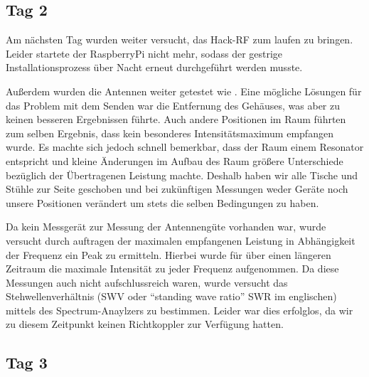 \documentclass[titlepage,11pt,a4paper,ngerman]{article}
\begin{document}
\subsection{Tag 2}

Am nächsten Tag wurden weiter versucht, das Hack-RF zum laufen zu bringen. Leider startete der RaspberryPi nicht mehr, sodass der gestrige Installationsprozess über Nacht erneut durchgeführt werden musste.\par
Außerdem wurden die Antennen weiter getestet wie . Eine mögliche Lösungen für das Problem mit dem Senden war die Entfernung des Gehäuses, was aber zu keinen besseren Ergebnissen führte. Auch andere Positionen im Raum führten zum selben Ergebnis, dass kein besonderes Intensitätsmaximum empfangen wurde. Es machte sich jedoch schnell bemerkbar, dass der Raum einem Resonator entspricht und kleine Änderungen im Aufbau des Raum größere Unterschiede bezüglich der Übertragenen Leistung machte. Deshalb haben wir alle Tische und Stühle zur Seite geschoben und bei zukünftigen Messungen weder Geräte noch unsere Positionen verändert um stets die selben Bedingungen zu haben.\par
Da kein Messgerät zur Messung der Antennengüte vorhanden war, wurde versucht durch auftragen der maximalen empfangenen Leistung in Abhängigkeit der Frequenz ein Peak zu ermitteln. Hierbei wurde für über einen längeren Zeitraum die maximale Intensität zu jeder Frequenz aufgenommen. Da diese Messungen auch nicht aufschlussreich waren, wurde versucht das Stehwellenverhältnis (SWV oder ``standing wave ratio'' SWR im englischen) mittels des Spectrum-Anaylzers zu bestimmen. Leider war dies erfolglos, da wir zu diesem Zeitpunkt keinen Richtkoppler zur Verfügung hatten.

\subsection{Tag 3}
\end{document}
